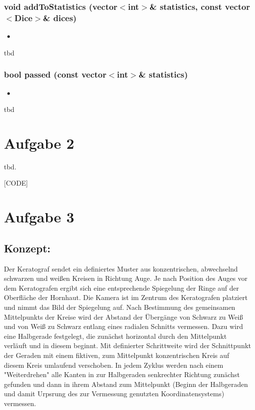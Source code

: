 \documentclass{../Vorlage/sebDenCls}
\begin{document}
\subsubsection{void addToStatistics (vector$<$int$>$\& statistics, const vector$<$Dice$>$\& dices)}
\begin{itemize}
	\item 
\end{itemize}
tbd

\subsubsection{bool passed (const vector$<$int$>$\& statistics)}
\begin{itemize}
	\item 
\end{itemize}
tbd

\section*{Aufgabe 2}

tbd.

[CODE]

\section*{Aufgabe 3}

\subsection{Konzept:}
Der Keratograf sendet ein definiertes Muster aus konzentrischen, abwechselnd schwarzen und weißen Kreisen in Richtung Auge. Je nach Position des Auges vor dem Keratografen ergibt sich eine entsprechende Spiegelung der Ringe auf der Oberfläche der Hornhaut. Die Kamera ist im Zentrum des Keratografen platziert und nimmt das Bild der Spiegelung auf. Nach Bestimmung des gemeinsamen Mittelpunkts der Kreise wird der Abstand der Übergänge von Schwarz zu Weiß und von Weiß zu Schwarz entlang eines radialen Schnitts vermessen. Dazu wird eine Halbgerade festgelegt, die zunächst horizontal durch den Mittelpunkt verläuft und in diesem beginnt. Mit definierter Schrittweite wird der Schnittpunkt der Geraden mit einem fiktiven, zum Mittelpunkt konzentrischen Kreis auf diesem Kreis umlaufend verschoben. In jedem Zyklus werden nach einem "Weiterdrehen" alle Kanten in zur Halbgeraden senkrechter Richtung zunächst gefunden und dann in ihrem Abstand zum Mittelpunkt (Beginn der Halbgeraden und damit Urpsrung des zur Vermessung genutzten Koordinatensystems) vermessen. 
\end{document}
